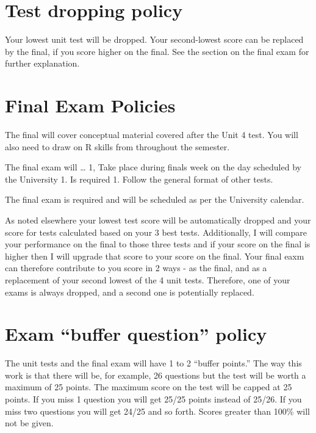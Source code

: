 \documentclass[
]{book}
\begin{document}
\hypertarget{test-dropping-policy}{%
\section{Test dropping policy}\label{test-dropping-policy}}

Your lowest unit test will be dropped. Your second-lowest score can be replaced by the final, if you score higher on the final. See the section on the final exam for further explanation.

\hypertarget{final-exam-policies}{%
\section{Final Exam Policies}\label{final-exam-policies}}

The final will cover conceptual material covered after the Unit 4 test. You will also need to draw on R skills from throughout the semester.

The final exam will \ldots{}
1, Take place during finals week on the day scheduled by the University
1. Is required
1. Follow the general format of other tests.

The final exam is required and will be scheduled as per the University calendar.

As noted elsewhere your lowest test score will be automatically dropped and your score for tests calculated based on your 3 best tests. Additionally, I will compare your performance on the final to those three tests and if your score on the final is higher then I will upgrade that score to your score on the final. Your final eaxm can therefore contribute to you score in 2 ways - as the final, and as a replacement of your second lowest of the 4 unit tests. Therefore, one of your exams is always dropped, and a second one is potentially replaced.

\hypertarget{exam-buffer-question-policy}{%
\section{Exam ``buffer question'' policy}\label{exam-buffer-question-policy}}

The unit tests and the final exam will have 1 to 2 ``buffer points.'' The way this work is that there will be, for example, 26 questions but the test will be worth a maximum of 25 points. The maximum score on the test will be capped at 25 points. If you miss 1 question you will get 25/25 points instead of 25/26. If you miss two questions you will get 24/25 and so forth. Scores greater than 100\% will not be given.
\end{document}
